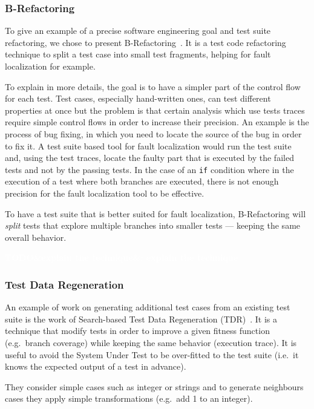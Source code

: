 \documentclass[11pt]{sdm}
\newcommand{\todo}[1]{\colorbox{Red!75}{\textcolor{white}{\textbf{TODO\ifx&#1&\else: #1\fi}}}}
\begin{document}
\subsubsection{B-Refactoring}
\label{brefactoring}
To give an example of a precise software engineering goal and test suite refactoring, we chose to present B-Refactoring~\cite{xuan2016b}.
It is a test code refactoring technique to split a test case into small test fragments, helping for fault localization for example.

To explain in more details, the goal is to have a simpler part of the control flow for each test.
Test cases, especially hand-written ones, can test different properties at once but the problem is that certain analysis which use tests traces require simple control flows in order to increase their precision.
An example is the process of bug fixing, in which you need to locate the source of the bug in order to fix it.
A test suite based tool for fault localization would run the test suite and, using the test traces, locate the faulty part that is executed by the failed tests and not by the passing tests.
In the case of an \texttt{if} condition where in the execution of a test where both branches are executed, there is not enough precision for the fault localization tool to be effective.

To have a test suite that is better suited for fault localization, B-Refactoring will \textit{split} tests that explore multiple branches into smaller tests --- keeping the same overall behavior.

\todo{explain the technique}

\subsubsection{Test Data Regeneration}
\label{tdr}
An example of work on generating additional test cases from an existing test suite is the work of Search-based Test Data Regeneration (TDR)~\cite{yoo2012test}.
It is a technique that modify tests in order to improve a given fitness function (e.g.\ branch coverage) while keeping the same behavior (execution trace).
It is useful to avoid the System Under Test to be over-fitted to the test suite (i.e.\ it knows the expected output of a test in advance).

They consider simple cases such as integer or strings and to generate neighbours cases they apply simple transformations (e.g.\ add 1 to an integer).
\end{document}
